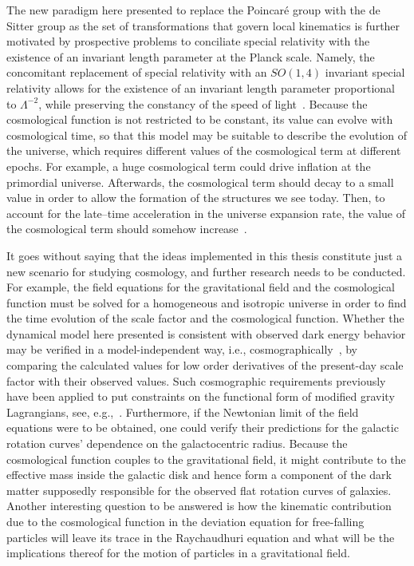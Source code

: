\documentclass[
final,
11pt,
a4paper,
DIV=11,
headinclude=true,
footinclude=false,
bibliography=totoc,
twoside=true,  %
BCOR=5mm
]{scrbook}
\begin{document}
The new paradigm here presented to replace the Poincar\'e group 
with the de Sitter group as the set of transformations that 
govern local kinematics is further motivated by prospective 
problems to conciliate special relativity with the existence of 
an invariant length parameter at the Planck scale. Namely, the 
concomitant replacement of special relativity with an $SO(1,4)$ 
invariant special relativity allows for the existence of an 
invariant length parameter proportional to $\Lambda^{-2}$, while 
preserving the constancy of the speed of 
light~\cite{Aldrovandi:2006vr}.  Because the cosmological 
function is not restricted to be constant, its value can evolve 
with cosmological time, so that this model may be suitable to 
describe the evolution of the universe, which requires different 
values of the cosmological term at different epochs. For example, 
a huge cosmological term could drive inflation at the primordial 
universe. Afterwards, the cosmological term should decay to 
a small value in order to allow the formation of the structures 
we see today. Then, to account for the late--time acceleration in 
the universe expansion rate, the value of the cosmological term 
should somehow increase~\cite{Araujo:2015oqa}.

It goes without saying that the ideas implemented in this thesis 
constitute just a new scenario for studying cosmology,
and further research needs to be conducted. For example, the 
field equations for the gravitational field and the cosmological 
function must be solved for a homogeneous and isotropic universe 
in order to find the time evolution of the scale factor and the 
cosmological function. Whether the dynamical model here presented 
is consistent with observed dark energy behavior may be verified 
in a model-independent way, i.e.,  
cosmographically~\cite{Visser:2004bf}, by comparing the 
calculated values for low order derivatives of the present-day 
scale factor with their observed values. Such cosmographic 
requirements previously have been applied to put constraints on 
the functional form of modified gravity Lagrangians, see, 
e.g.,~\cite{Capozziello:2015rda}. Furthermore, if the Newtonian 
limit of the field equations were to be obtained, one could 
verify their predictions for the galactic rotation curves' 
dependence on the galactocentric radius. Because the cosmological 
function couples to the gravitational field, it might contribute 
to the effective mass inside the galactic disk and hence form 
a component of the dark matter supposedly responsible for the 
observed flat rotation curves of galaxies. Another interesting 
question to be answered is how the kinematic contribution due to 
the cosmological function in the deviation equation for 
free-falling particles will leave its trace in the Raychaudhuri 
equation and what will be the implications thereof for the motion 
of particles in a gravitational field.

\backmatter%


%
%
\end{document}
